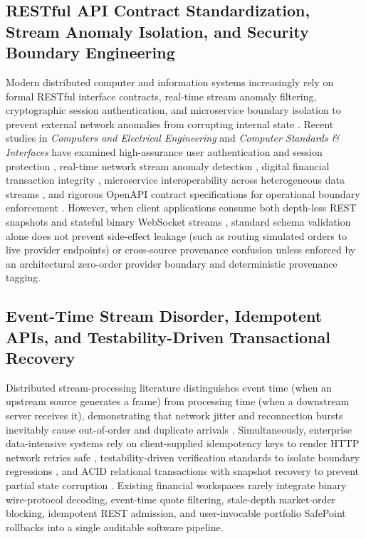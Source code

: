 \documentclass[journal,onecolumn,10pt]{IEEEtran}
\begin{document}
\subsection{RESTful API Contract Standardization, Stream Anomaly Isolation, and Security Boundary Engineering}
Modern distributed computer and information systems increasingly rely on formal RESTful interface contracts, real-time stream anomaly filtering, cryptographic session authentication, and microservice boundary isolation to prevent external network anomalies from corrupting internal state \cite{fielding2000,gonzalezmora2023,rath2023,fresnoaranda2024,alrawili2024,sharma2023caee,trandigital2022caee}. Recent studies in \emph{Computers and Electrical Engineering} and \emph{Computer Standards \& Interfaces} have examined high-assurance user authentication and session protection \cite{alrawili2024}, real-time network stream anomaly detection \cite{sharma2023caee}, digital financial transaction integrity \cite{trandigital2022caee}, microservice interoperability across heterogeneous data streams \cite{rath2023}, and rigorous OpenAPI contract specifications for operational boundary enforcement \cite{gonzalezmora2023,fresnoaranda2024}. However, when client applications consume both depth-less REST snapshots and stateful binary WebSocket streams \cite{rfc6455}, standard schema validation alone does not prevent side-effect leakage (such as routing simulated orders to live provider endpoints) or cross-source provenance confusion unless enforced by an architectural zero-order provider boundary and deterministic provenance tagging.

\subsection{Event-Time Stream Disorder, Idempotent APIs, and Testability-Driven Transactional Recovery}
Distributed stream-processing literature distinguishes event time (when an upstream source generates a frame) from processing time (when a downstream server receives it), demonstrating that network jitter and reconnection bursts inevitably cause out-of-order and duplicate arrivals \cite{akidau2015,lamport1978,hasbrouck2013}. Simultaneously, enterprise data-intensive systems rely on client-supplied idempotency keys to render HTTP network retries safe \cite{helland2012}, testability-driven verification standards to isolate boundary regressions \cite{parsa2025}, and ACID relational transactions with snapshot recovery to prevent partial state corruption \cite{gray1993,kleppmann2017,fowler2002}. Existing financial workspaces rarely integrate binary wire-protocol decoding, event-time quote filtering, stale-depth market-order blocking, idempotent REST admission, and user-invocable portfolio SafePoint rollbacks into a single auditable software pipeline.
\end{document}
